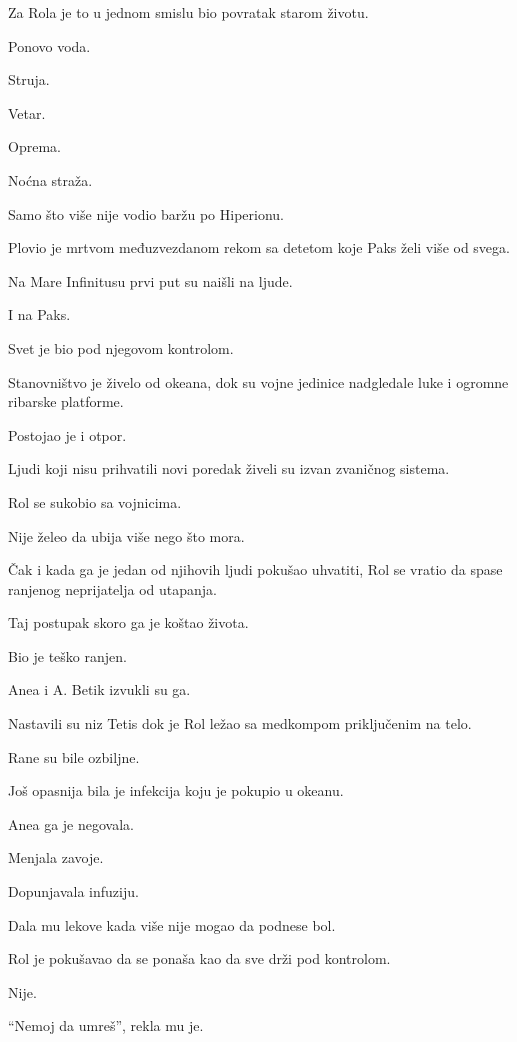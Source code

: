 Za Rola je to u jednom smislu bio povratak starom životu.

Ponovo voda.

Struja.

Vetar.

Oprema.

Noćna straža.

Samo što više nije vodio baržu po Hiperionu.

Plovio je mrtvom međuzvezdanom rekom sa detetom koje Paks želi više od svega.

\bigskip

Na Mare Infinitusu prvi put su naišli na ljude.

I na Paks.

Svet je bio pod njegovom kontrolom.

Stanovništvo je živelo od okeana, dok su vojne jedinice nadgledale luke i ogromne ribarske platforme.

Postojao je i otpor.

Ljudi koji nisu prihvatili novi poredak živeli su izvan zvaničnog sistema.

\bigskip

Rol se sukobio sa vojnicima.

Nije želeo da ubija više nego što mora.

Čak i kada ga je jedan od njihovih ljudi pokušao uhvatiti, Rol se vratio da spase ranjenog neprijatelja od utapanja.

Taj postupak skoro ga je koštao života.

\bigskip

Bio je teško ranjen.

Anea i A. Betik izvukli su ga.

Nastavili su niz Tetis dok je Rol ležao sa medkompom priključenim na telo.

Rane su bile ozbiljne.

Još opasnija bila je infekcija koju je pokupio u okeanu.

\bigskip

Anea ga je negovala.

Menjala zavoje.

Dopunjavala infuziju.

Dala mu lekove kada više nije mogao da podnese bol.

Rol je pokušavao da se ponaša kao da sve drži pod kontrolom.

Nije.

\bigskip

``Nemoj da umreš'', rekla mu je.

